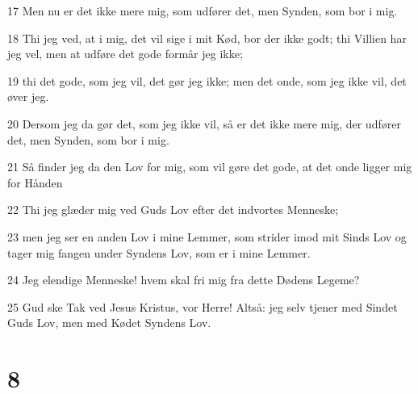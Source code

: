 \par 17 Men nu er det ikke mere mig, som udfører det, men Synden, som bor i mig.
\par 18 Thi jeg ved, at i mig, det vil sige i mit Kød, bor der ikke godt; thi Villien har jeg vel, men at udføre det gode formår jeg ikke;
\par 19 thi det gode, som jeg vil, det gør jeg ikke; men det onde, som jeg ikke vil, det øver jeg.
\par 20 Dersom jeg da gør det, som jeg ikke vil, så er det ikke mere mig, der udfører det, men Synden, som bor i mig.
\par 21 Så finder jeg da den Lov for mig, som vil gøre det gode, at det onde ligger mig for Hånden
\par 22 Thi jeg glæder mig ved Guds Lov efter det indvortes Menneske;
\par 23 men jeg ser en anden Lov i mine Lemmer, som strider imod mit Sinds Lov og tager mig fangen under Syndens Lov, som er i mine Lemmer.
\par 24 Jeg elendige Menneske! hvem skal fri mig fra dette Dødens Legeme?
\par 25 Gud ske Tak ved Jesus Kristus, vor Herre! Altså: jeg selv tjener med Sindet Guds Lov, men med Kødet Syndens Lov.

\chapter{8}

